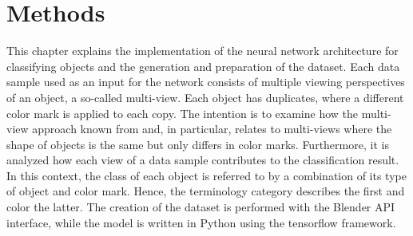 \chapter{Methods}
\label{sec:methods}
This chapter explains the implementation of the neural network architecture for classifying objects and the generation and preparation of the dataset.
Each data sample used as an input for the network consists of multiple viewing perspectives of an object, a so-called multi-view.
Each object has duplicates, where a different color mark is applied to each copy.
The intention is to examine how the multi-view approach known from \cite{Su:2015:MCN:2919332.2919750} and, in particular, \cite{Feng2018} relates to multi-views where the shape of objects is the same but only differs in color marks.
Furthermore, it is analyzed how each view of a data sample contributes to the classification result.
In this context, the class of each object is referred to by a combination of its type of object and color mark.
Hence, the terminology category describes the first and color the latter.
The creation of the dataset is performed with the Blender API interface, while the model is written in Python using the tensorflow framework.





